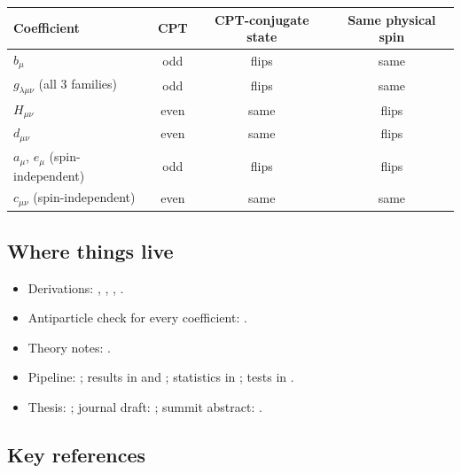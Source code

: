 \documentclass[11pt,a4paper]{article}
\begin{document}
\begin{center}
\begin{tabular}{@{}lccc@{}}
\toprule
Coefficient & CPT & CPT-conjugate state & Same physical spin \\
\midrule
$b_\mu$ & odd & flips & same \\
$g_{\lambda\mu\nu}$ (all 3 families) & odd & flips & same \\
$H_{\mu\nu}$ & even & same & flips \\
$d_{\mu\nu}$ & even & same & flips \\
$a_\mu$, $e_\mu$ (spin-independent) & odd & flips & flips \\
$c_{\mu\nu}$ (spin-independent) & even & same & same \\
\bottomrule
\end{tabular}
\end{center}

\subsection{Where things live}

\begin{itemize}[leftmargin=1.2em]
\item Derivations: ,
, ,
.
\item Antiparticle check for every coefficient:
.
\item Theory notes: .
\item Pipeline: ; results in
 and
; statistics in
; tests in .
\item Thesis: ; journal draft:
; summit abstract:
.
\end{itemize}

\subsection{Key references}
\end{document}
